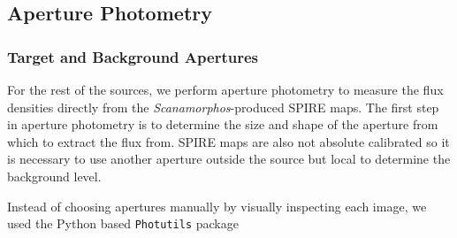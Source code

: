 \subsection{Aperture Photometry}\label{aperture}
\subsubsection{Target and Background Apertures}
For the rest of the sources, we perform aperture photometry to measure the flux densities directly from the \textit{Scanamorphos}-produced SPIRE maps. The first step in aperture photometry is to determine the size and shape of the aperture from which to extract the flux from. SPIRE maps are also not absolute calibrated so it is necessary to use another aperture outside the source but local to determine the background level.

Instead of choosing apertures manually by visually inspecting each image, we used the Python based \texttt{Photutils} package 
  